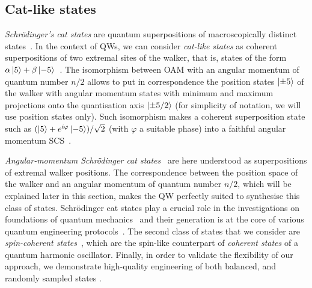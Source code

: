 \subsection{Cat-like states}
\label{subsec:expQWs:catstates}

\emph{Schrödinger's cat states} are quantum superpositions of macroscopically distinct states~\cite{yurke1986generating,bužek1995quantum}. In the context of QWs, we can consider \emph{cat-like states} as coherent superpositions of two extremal sites of the walker, that is, states of the form $\alpha\ket{5}+\beta\ket{-5}$~\cite{zhang2016creating}. The isomorphism between \ac{OAM} with an angular momentum of quantum number $n/2$ allows to put in correspondence the position states $\ket{\pm 5}$ of the walker with angular momentum states with minimum and maximum projections onto the quantisation axis $\ket{\pm 5/2}$ (for simplicity of notation, we will use position states only). Such isomorphism makes a coherent superposition state such as $(\ket{5}+e^{i\varphi}\ket{-5})/\sqrt{2}$ (with $\varphi$ a suitable phase) into a faithful angular momentum SCS~\cite{militello2006distilling}. 

\emph{Angular-momentum Schrödinger cat states}~\cite{militello2006distilling} are here understood as superpositions of extremal walker positions. The correspondence between the position space of the walker and an angular momentum of quantum number $n/2$, which will be explained later in this section, makes the \ac{QW} perfectly suited to synthesise this class of states. Schrödinger cat states play a crucial role in the investigations on foundations of quantum mechanics~\cite{schrodinger1935gegenwartige} and their generation is at the core of various quantum engineering protocols~\cite{brune1992manipulation, monroe1996schrodinger,agarwal1997atomic, zhang2016creating}. The second class of states that we consider are \emph{spin-coherent states}~\cite{ulyanov1999spin}, which are the spin-like counterpart of \emph{coherent states} of a quantum harmonic oscillator. Finally, in order to validate the flexibility of our approach, we demonstrate high-quality engineering of both balanced, and randomly sampled states .


